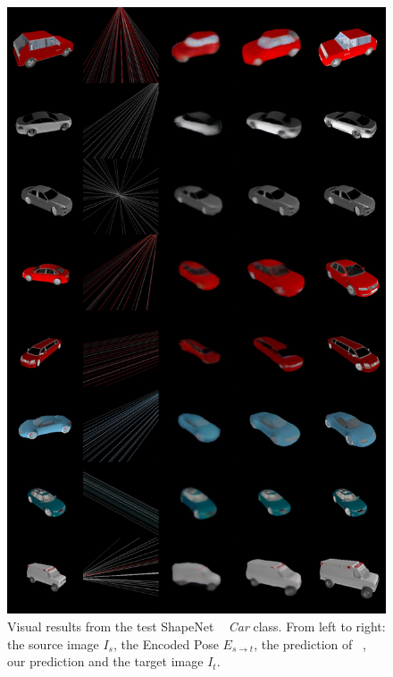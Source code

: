 \begin{figure}[htp!]
    \begin{center}
    \includegraphics[width=.9\textwidth]{images/epipolarnvs/SuppMat_Car.jpg}
    \end{center}
     \caption{Visual results from the test ShapeNet ~\cite{Shapenet} \textit{Car} class. From left to right: the source image  $I_s$, the Encoded Pose $E_{s\xrightarrow{}t}$,  the prediction of ~\cite{NVS_skip}, our prediction and the target image $I_t$.}     \label{fig:add_visCar}
\end{figure}

